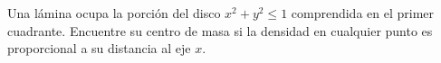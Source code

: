 \item Una lámina ocupa la porción del disco $x^2 + y^2 \le 1$ comprendida en el primer cuadrante. Encuentre su centro de masa si la densidad en cualquier punto es proporcional a su distancia al eje $x$.
